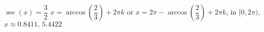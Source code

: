  {$\sec(x) = \dfrac{3}{2}$}
{ $x = \arccos\left(\dfrac{2}{3}\right) + 2\pi k$ or $x = 2\pi - \arccos\left(\dfrac{2}{3}\right) + 2\pi k$, in  $[0, 2\pi)$, $x \approx 0.8411, \, 5.4422$}
